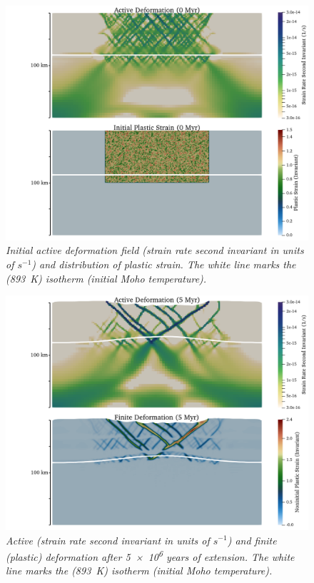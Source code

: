 \begin{figure}
\centering
\includegraphics[width=\textwidth]{cookbooks/continental_extension/doc/continental_extension_cookbook_0myr.png}
\caption{\it Initial active deformation field (strain rate second invariant in units of $\si{s}^{-1}$) and distribution of plastic strain. The white line marks the (\SI{893}{K}) isotherm (initial Moho temperature).}
\label{fig:continental_extension_cookbook_0myr}
\end{figure}
\begin{figure}
\includegraphics[width=\textwidth]{cookbooks/continental_extension/doc/continental_extension_cookbook_5myr.png}
\caption{\it Active (strain rate second invariant in units of $\si{s}^{-1}$) and finite (plastic) deformation after \num{5e6} years of extension. The white line marks the (\SI{893}{K}) isotherm (initial Moho temperature).}
\label{fig:continental_extension_cookbook_5myr}
\end{figure}
